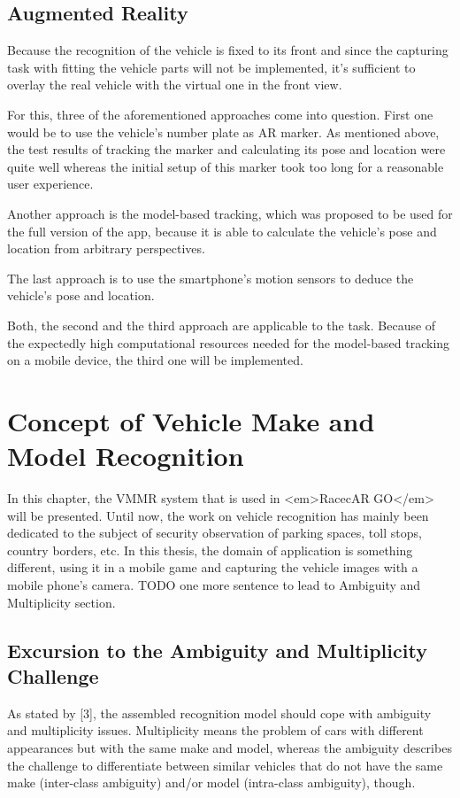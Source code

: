 \subsection{Augmented Reality}
Because the recognition of the vehicle is fixed to its front and since the capturing task with fitting the vehicle parts will not be implemented, it’s sufficient to overlay the real vehicle with the virtual one in the front view.

For this, three of the aforementioned approaches come into question. First one would be to use the vehicle’s number plate as AR marker. As mentioned above, the test results of tracking the marker and calculating its pose and location were quite well whereas the initial setup of this marker took too long for a reasonable user experience.

Another approach is the model-based tracking, which was proposed to be used for the full version of the app, because it is able to calculate the vehicle’s pose and location from arbitrary perspectives.

The last approach is to use the smartphone’s motion sensors to deduce the vehicle’s pose and location.

Both, the second and the third approach are applicable to the task. Because of the expectedly high computational resources needed for the model-based tracking on a mobile device, the third one will be implemented.


\section{Concept of Vehicle Make and Model Recognition}
In this chapter, the VMMR system that is used in <em>RacecAR GO</em> will be presented. Until now, the work on vehicle recognition has mainly been dedicated to the subject of security observation of parking spaces, toll stops, country borders, etc. In this thesis, the domain of application is something different, using it in a mobile game and capturing the vehicle images with a mobile phone's camera.
TODO one more sentence to lead to Ambiguity and Multiplicity section.

\subsection{Excursion to the Ambiguity and Multiplicity Challenge}
As stated by [3], the assembled recognition model should cope with ambiguity and multiplicity issues. Multiplicity means the problem of cars with different appearances but with the same make and model, whereas the ambiguity describes the challenge to differentiate between similar vehicles that do not have the same make (inter-class ambiguity) and/or model (intra-class ambiguity), though.

